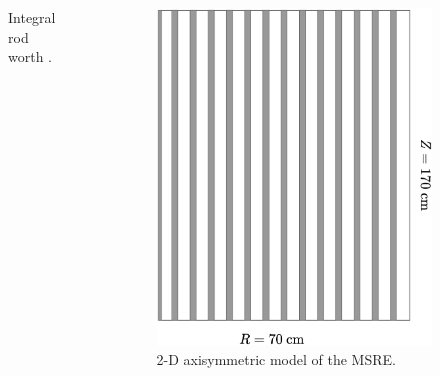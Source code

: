 \begin{frame}
\begin{columns}
\begin{figure}
      \caption{Integral rod worth \cite{prince_zero-power_1968}.}
    \end{figure}
    \hfill
    \column[t]{4cm}
    \begin{figure}
      \centering
      \includegraphics[width=.9\columnwidth]{images/msre-2d}
      \caption{2-D axisymmetric model of the MSRE.}
    \end{figure}
  \end{columns}
\end{frame}

